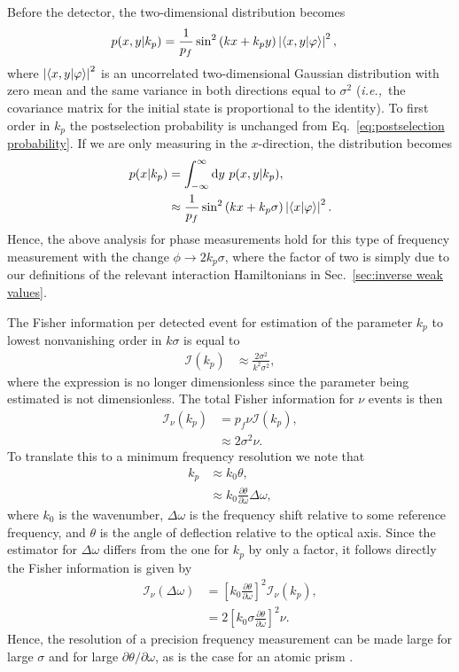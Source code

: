 Before the detector, the two-dimensional distribution becomes
\begin{align}
	p(x,y|k_p) &= \frac{1}{p_f} \sin^2\left(kx + k_p y\right)\left|\langle x,y \vert \varphi \rangle\right|^2,
\end{align} 
where $\left|\langle x,y \vert \varphi \rangle\right|^2$ is an uncorrelated two-dimensional Gaussian distribution with zero mean and the same variance in both directions equal to $\sigma^2$ (\emph{i.e.,}~the covariance matrix for the initial state is proportional to the identity).  To first order in $k_p$ the postselection probability is unchanged from Eq.~\eqref{eq:postselection probability}.  If we are only measuring in the $x$-direction, the distribution becomes
\begin{align}
	\nonumber p(x|k_p) &= \int_{-\infty}^{\infty} \text{d}y~p(x,y|k_p), \\
	&\approx \frac{1}{p_f}\sin^2\left(kx +k_p \sigma \right)\left|\langle x \vert \varphi \rangle\right|^2.
\end{align}
Hence, the above analysis for phase measurements hold for this type of frequency measurement with the change $\phi \rightarrow 2k_p \sigma$, where the factor of two is simply due to our definitions of the relevant interaction Hamiltonians in Sec.~\ref{sec:inverse weak values}.  

The Fisher information per detected event for estimation of the parameter $k_p$ to lowest nonvanishing order in $k\sigma$ is equal to 
\begin{align}
	\mathcal{I}(k_p) &\approx \frac{2\sigma^2}{k^2\sigma^2}, 
\end{align} 
where the expression is no longer dimensionless since the parameter being estimated is not dimensionless.  The total Fisher information for $\nu$ events is then
\begin{align}
	\mathcal{I}_\nu(k_p) &= p_f \nu \mathcal{I}(k_p), \nonumber \\
	& \approx 2 \sigma^2 \nu .
\end{align}
To translate this to a minimum frequency resolution we note that 
\begin{align}
	k_p &\approx k_0 \theta, \nonumber \\
	& \approx k_0 \frac{\partial \theta}{\partial \omega}\Delta \omega,
\end{align}
where $k_0$ is the wavenumber, $\Delta \omega$ is the frequency shift relative to some reference frequency, and $\theta$ is the angle of deflection relative to the optical axis.  Since the estimator for $\Delta \omega$ differs from the one for $k_p$ by only a factor, it follows directly the Fisher information is given by 
\begin{align}
	\mathcal{I}_\nu(\Delta \omega) &= \left[k_0\frac{\partial \theta}{\partial \omega}\right]^{2}\mathcal{I}_\nu(k_p), \nonumber \\
	&= 2\left[k_0\sigma\frac{\partial \theta}{\partial \omega}\right]^{2}\nu.
\end{align}
Hence, the resolution of a precision frequency measurement can be made large for large $\sigma$ and for large $\partial\theta/\partial\omega$, as is the case for an atomic prism \cite{Starling2012}.

